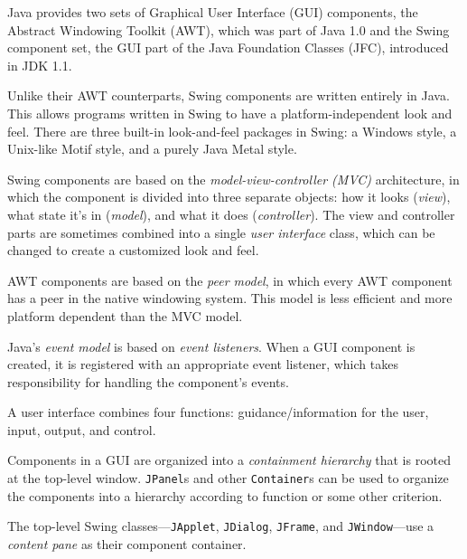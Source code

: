 \label{summaryof-important-points}
\begin{SMBL}
\item  Java provides two sets of Graphical User Interface
(GUI) components, the Abstract Windowing Toolkit (AWT), which was part
of Java 1.0 and the Swing component set, the
GUI part of the Java Foundation Classes (JFC), introduced in JDK 1.1.

\item  Unlike their AWT counterparts, Swing components are written
entirely in Java. This allows programs written in Swing to have
a platform-independent look and feel. There are three built-in
look-and-feel packages in Swing: a Windows  style, a Unix-like
Motif style, and a purely Java Metal style.

\item  Swing components are based on the {\it model-view-controller (MVC)}
architecture, in which the component is divided into three separate
objects: how it looks ({\it view}), what state it's in ({\it model}),
and what it does ({\it controller}). The view and controller parts are
sometimes combined into a single {\it user interface} class, which can
be changed to create a customized look and feel.

\item  AWT components are based on the {\it peer model}, in which
every AWT component has a peer in the native windowing system. This
model is less efficient and more platform dependent than the MVC model.

\item  Java's {\it event model} is based on {\it event listeners}. When
a GUI component is created, it is registered with an appropriate event
listener, which takes responsibility for handling the component's events.

\item  A user interface combines four functions: guidance/information for the user,
input, output, and control.

\item  Components in a GUI are organized into a {\it containment
hierarchy} that is rooted at the top-level window. {\tt JPanel}s and other
{\tt Container}s can be used to organize the components into a hierarchy
according to function or some other criterion.

\item  The top-level Swing classes---{\tt JApplet}, {\tt JDialog},
{\tt JFrame}, and {\tt JWindow}---use a {\it content pane} as their
component container.


\end{SMBL}
